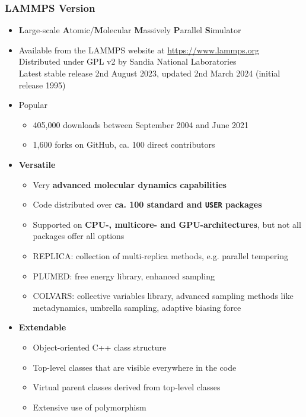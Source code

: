 \documentclass[slidestop,compress,9pt]{beamer}
\begin{document}
\begin{frame}
\frametitle{LAMMPS Version}
\begin{itemize}
\item \textbf{L}arge-scale \textbf{A}tomic/\textbf{M}olecular \textbf{M}assively \textbf{P}arallel \textbf{S}imulator
\item Available from the LAMMPS website at \href{https://www.lammps.org}{https://www.lammps.org}\\
Distributed under GPL v2 by Sandia National Laboratories\\
Latest stable release 2nd August 2023, updated 2nd March 2024 (initial release 1995)
\item Popular
\begin{itemize}
\item 405,000 downloads between September 2004 and June 2021
\item 1,600 forks on GitHub, ca. 100 direct contributors
\end{itemize}
\item \textbf{Versatile}
\begin{itemize}
\item Very \textbf{advanced molecular dynamics capabilities}
\item Code distributed over \textbf{ca. 100 standard and \texttt{USER} packages}
\item Supported on \textbf{CPU-, multicore- and GPU-architectures}, but not all packages offer all options
\item REPLICA: collection of multi-replica methods, e.g. parallel tempering
\item PLUMED: free energy library, enhanced sampling
\item COLVARS: collective variables library, advanced sampling methods like metadynamics, umbrella sampling, adaptive biasing force 
\end{itemize}
\item \textbf{Extendable}
\begin{itemize}
\item Object-oriented C++ class structure
\item Top-level classes that are visible everywhere in the code
\item Virtual parent classes derived from top-level classes
\item Extensive use of polymorphism
\end{itemize}
\end{itemize}


\end{frame}
\end{document}

